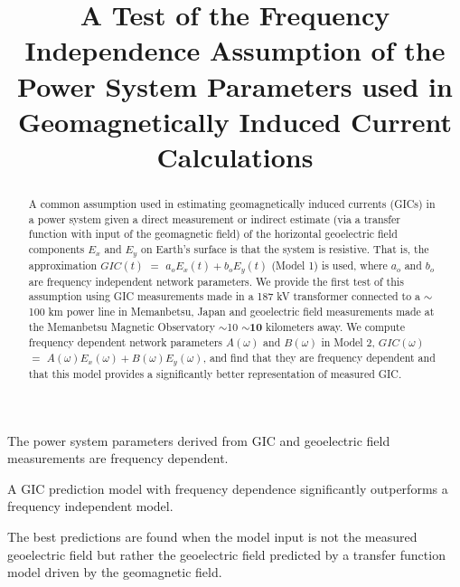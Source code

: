 \documentclass[draft,linenumbers]{agujournal2018}
\begin{document}

\title{A Test of the Frequency Independence Assumption of the Power System Parameters used in Geomagnetically Induced Current Calculations}





\begin{keypoints}
\item The power system parameters derived from GIC and geoelectric field measurements are frequency dependent.
\item A GIC prediction model with frequency dependence significantly outperforms a frequency independent model.
\item The best predictions are found when the model input is not the measured geoelectric field but rather the geoelectric field predicted by a transfer function model driven by the geomagnetic field.
\end{keypoints}

\begin{abstract}
A common assumption used in estimating geomagnetically induced currents (GICs) in a power system given a direct measurement or indirect estimate (via a transfer function with input of the geomagnetic field) of the horizontal geoelectric field components $E_x$ and $E_y$ on Earth's surface is that the system is resistive. That is, the approximation $GIC(t)$  $=$ $a_oE_x(t) + b_oE_y(t)$ (Model 1) is used, where $a_o$ and $b_o$ are frequency independent network parameters.  We provide the first test of this assumption using GIC measurements made in a 187 kV transformer connected to a $\sim$100 km power line in Memanbetsu, Japan and geoelectric field measurements made at the Memanbetsu Magnetic Observatory $\sim$10 $\sim${\color{red}\textbf{10}} kilometers away.  We compute frequency dependent network parameters  $A(\omega)$ and $B(\omega)$ in Model 2, $GIC(\omega)$ $=$ $A(\omega)E_x(\omega) + B(\omega)E_y(\omega)$, and find that they are frequency dependent and that this model provides a significantly better representation of measured GIC.
\end{abstract}
\end{document}
